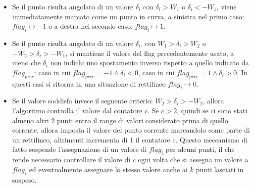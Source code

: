     \begin{itemize}
        \item Se il punto risulta angolato di un valore $\delta_i$ con $\delta_i > W_1$ o $\delta_i < -W_1$, viene immediatamente marcato come un punto in curva, a sinistra nel primo caso: $flag_i \mapsto -1$ o a destra nel secondo caso: $flag_i \mapsto 1$.
        \item Se il punto risulta angolato di un valore $\delta_i$, con $W_1>\delta_i>W_2$ o $-W_2>\delta_i>-W_1$, si mantiene il valore del flag precedentemente usato, a meno che $\delta_i$ non indichi uno spostamento inverso rispetto a quello indicato da $flag_{prec}$: caso in cui $flag_{prec} = -1 \land \delta_i<0$, caso in cui $flag_{prec} = 1 \land \delta_i>0$. In questi casi si ritorna in una situazione di rettilineo $flag_i \mapsto 0$.
        \item Se il valore soddisfa invece il seguente criterio: $W_2>\delta_i>-W_2$, allora l'algoritmo controlla il valore dal contatore $c$. Se $c>2$, quindi se ci sono stati almeno altri 2 punti entro il range di valori considerato prima di quello corrente, allora imposta il valore del punto corrente marcandolo come parte di un rettilineo, altrimenti incrementa di 1 il contatore c.
        Questo meccanismo di fatto sospende l'assegnazione di un valore di $flag_i$ per alcuni punti, il che rende necessario controllare il valore di $c$ ogni volta che si assegna un valore a $flag_i$ ed eventualmente assegnare lo stesso valore anche ai $k$ punti lasciati in sospeso.
    \end{itemize}
